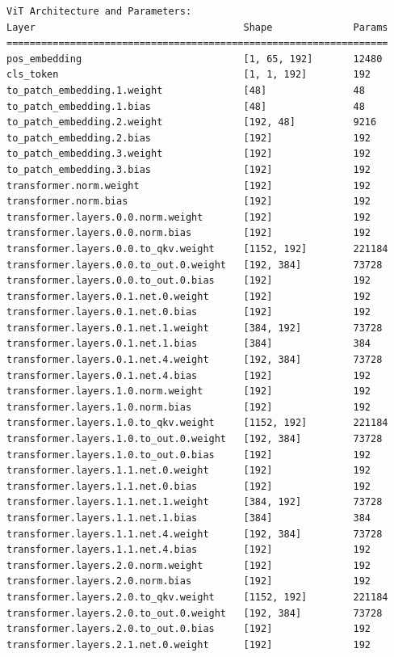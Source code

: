 \documentclass[notitlepage,cs4size,punct,oneside]{ctexrep}
\numberwithin{equation}{chapter}
\theoremstyle{mystyle}
\begin{document}
\begin{appendices}
{\begin{lstlisting}[style=output]
ViT Architecture and Parameters:
Layer                                    Shape              Params
==================================================================
pos_embedding                            [1, 65, 192]       12480
cls_token                                [1, 1, 192]        192
to_patch_embedding.1.weight              [48]               48
to_patch_embedding.1.bias                [48]               48
to_patch_embedding.2.weight              [192, 48]          9216
to_patch_embedding.2.bias                [192]              192
to_patch_embedding.3.weight              [192]              192
to_patch_embedding.3.bias                [192]              192
transformer.norm.weight                  [192]              192
transformer.norm.bias                    [192]              192
transformer.layers.0.0.norm.weight       [192]              192
transformer.layers.0.0.norm.bias         [192]              192
transformer.layers.0.0.to_qkv.weight     [1152, 192]        221184
transformer.layers.0.0.to_out.0.weight   [192, 384]         73728
transformer.layers.0.0.to_out.0.bias     [192]              192
transformer.layers.0.1.net.0.weight      [192]              192
transformer.layers.0.1.net.0.bias        [192]              192
transformer.layers.0.1.net.1.weight      [384, 192]         73728
transformer.layers.0.1.net.1.bias        [384]              384
transformer.layers.0.1.net.4.weight      [192, 384]         73728
transformer.layers.0.1.net.4.bias        [192]              192
transformer.layers.1.0.norm.weight       [192]              192
transformer.layers.1.0.norm.bias         [192]              192
transformer.layers.1.0.to_qkv.weight     [1152, 192]        221184
transformer.layers.1.0.to_out.0.weight   [192, 384]         73728
transformer.layers.1.0.to_out.0.bias     [192]              192
transformer.layers.1.1.net.0.weight      [192]              192
transformer.layers.1.1.net.0.bias        [192]              192
transformer.layers.1.1.net.1.weight      [384, 192]         73728
transformer.layers.1.1.net.1.bias        [384]              384
transformer.layers.1.1.net.4.weight      [192, 384]         73728
transformer.layers.1.1.net.4.bias        [192]              192
transformer.layers.2.0.norm.weight       [192]              192
transformer.layers.2.0.norm.bias         [192]              192
transformer.layers.2.0.to_qkv.weight     [1152, 192]        221184
transformer.layers.2.0.to_out.0.weight   [192, 384]         73728
transformer.layers.2.0.to_out.0.bias     [192]              192
transformer.layers.2.1.net.0.weight      [192]              192

\end{lstlisting}}
\end{appendices}
\end{document}
